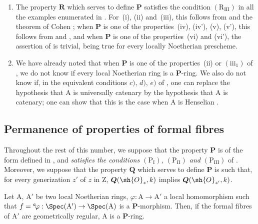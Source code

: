 \begin{remarks}[7.3.19]
\label{IV.7.3.19}
\begin{enumerate}[label=\emph{\roman*)}]
  \item The property $\boldsymbol{R}$ which serves to define $\boldsymbol{P}$ satisfies the condition $(\mathrm{R_{III}})$ in all the examples enumerated in .
  For~(i), (ii) and~(iii), this follows from  and the theorem of Cohen ; when $\boldsymbol{P}$ is one of the properties~(iv), (iv'), (v), (v'), this follows from  and , and when $\boldsymbol{P}$ is one of the properties~(vi) and (vi'), the assertion of  is trivial, being true for every locally Noetherian prescheme.

  \item We have already noted  that when $\boldsymbol{P}$ is one of the properties~(ii) or $(\mathrm{iii}_1)$ of , we do not know if every local Noetherian ring is a $\boldsymbol{P}$-ring.
  We also do not know if, in the equivalent conditions $c)$, $d)$, $e)$ of , one can replace the hypothesis that $\mathrm{A}$ is universally catenary by the hypothesis that $\mathrm{A}$ is catenary; one can show that this is the case when $\mathrm{A}$ is Henselian .
\end{enumerate}
\end{remarks}


\subsection{Permanence of properties of formal fibres}
\label{subsection:IV.7.4}

\begin{env}[7.4.1]
\label{IV.7.4.1}
Throughout the rest of this number, we suppose that the property $\boldsymbol{P}$ is of the form defined in , and \emph{satisfies the conditions $(\mathrm{P_I})$, $(\mathrm{P_{II}})$ and $(\mathrm{P_{III}})$} of .
Moreover, we suppose that the property $\boldsymbol{Q}$ which serves to define $\boldsymbol{P}$ is such that, for every generization $z'$ of $z$ in $\mathrm{Z}$, $\boldsymbol{Q}(\sh{O}_z,k)$ implies $\boldsymbol{Q}(\sh{O}_{z'},k)$.
\end{env}

\begin{lemma}[7.4.2]
\label{IV.7.4.2}
Let $\mathrm{A}$, $\mathrm{A}'$ be two local Noetherian rings, $\varphi:\mathrm{A}\to\mathrm{A}'$ a local homomorphism such that $f={}^a\!\varphi:\Spec(\mathrm{A}')\to\Spec(\mathrm{A})$ is a $\boldsymbol{P}$-morphism.
Then, if the formal fibres of $\mathrm{A}'$ are geometrically regular, $\mathrm{A}$ is a $\boldsymbol{P}$-ring.
\end{lemma}


